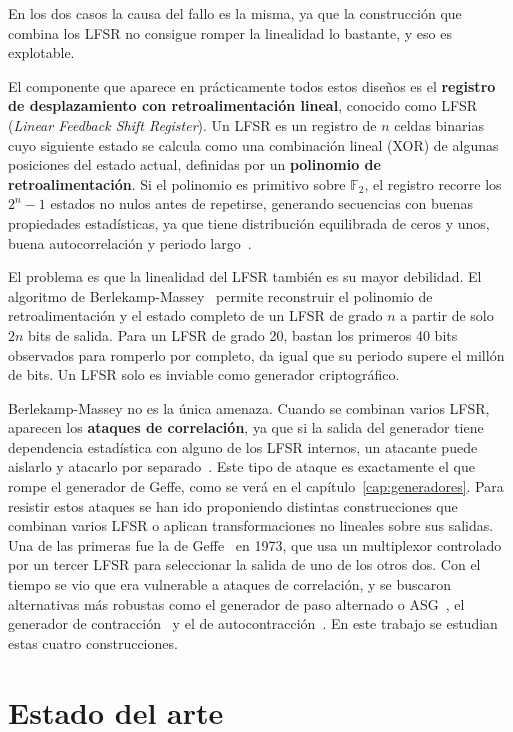 En los dos casos la causa del fallo es la misma, ya que la construcción que combina los LFSR no consigue romper la linealidad lo bastante, y eso es explotable.

El componente que aparece en prácticamente todos estos diseños es el \textbf{registro de desplazamiento con retroalimentación lineal},
conocido como LFSR (\textit{Linear Feedback Shift Register}). Un LFSR es un registro de $n$ celdas binarias
cuyo siguiente estado se calcula como una combinación lineal (XOR) de algunas posiciones del estado actual,
definidas por un \textbf{polinomio de retroalimentación}. Si el polinomio es primitivo sobre $\mathbb{F}_2$,
el registro recorre los $2^n - 1$ estados no nulos antes de repetirse, generando secuencias con buenas propiedades estadísticas,
ya que tiene distribución equilibrada de ceros y unos, buena autocorrelación y periodo largo~\cite{menezes1996}.

El problema es que la linealidad del LFSR también es su mayor debilidad.
El algoritmo de Berlekamp-Massey~\cite{massey1969} permite reconstruir el polinomio de retroalimentación y el estado completo
de un LFSR de grado $n$ a partir de solo $2n$ bits de salida. Para un LFSR de grado 20,
bastan los primeros 40 bits observados para romperlo por completo,
da igual que su periodo supere el millón de bits. Un LFSR solo es inviable como generador criptográfico.

Berlekamp-Massey no es la única amenaza. Cuando se combinan varios LFSR, aparecen los \textbf{ataques de correlación},
ya que si la salida del generador tiene dependencia estadística con alguno de los LFSR internos,
un atacante puede aislarlo y atacarlo por separado~\cite{meier1994}. Este tipo de ataque es exactamente el que rompe el generador de Geffe,
como se verá en el capítulo~\ref{cap:generadores}. Para resistir estos ataques se han ido proponiendo distintas construcciones que combinan varios LFSR
o aplican transformaciones no lineales sobre sus salidas. Una de las primeras fue la de Geffe~\cite{geffe1973} en 1973,
que usa un multiplexor controlado por un tercer LFSR para seleccionar la salida de uno de los otros dos.
Con el tiempo se vio que era vulnerable a ataques de correlación, y se buscaron alternativas más robustas
como el generador de paso alternado o ASG~\cite{gunther1987}, el generador de contracción~\cite{coppersmith1993}
y el de autocontracción~\cite{meier1994}. En este trabajo se estudian estas cuatro construcciones.

\section{Estado del arte}

